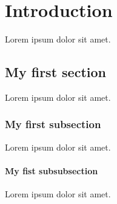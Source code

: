 \chapter{Introduction}
\label{cha:intro}
Lorem ipsum dolor sit amet.

\section{My first section}
Lorem ipsum dolor sit amet.

\subsection{My first subsection}
Lorem ipsum dolor sit amet.

\subsubsection{My fist subsubsection}
Lorem ipsum dolor sit amet.